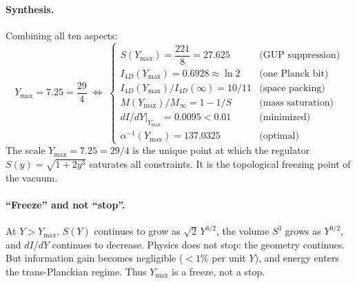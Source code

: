 \documentclass[a4paper,7pt,oneside,openany]{book}
\begin{document}
\paragraph{Synthesis.} Combining all ten aspects:
\begin{equation}
\boxed{
Y_{\max} = 7.25 = \frac{29}{4} \; \Longleftrightarrow \;
\begin{cases}
S(Y_{\max}) = \dfrac{221}{8} = 27.625 & \text{(GUP suppression)} \\
I_{4D}(Y_{\max}) = 0.6928 \approx \ln 2 & \text{(one Planck bit)} \\
I_{4D}(Y_{\max})/I_{4D}(\infty) = 10/11 & \text{(space packing)} \\
M(Y_{\max})/M_\infty = 1 - 1/S & \text{(mass saturation)} \\
dI/dY|_{Y_{\max}} = 0.0095 < 0.01 & \text{(minimized)} \\
\alpha^{-1}(Y_{\max}) = 137.0325 & \text{(optimal)}
\end{cases}
}
\label{eq:mviseqn}
\end{equation}
The scale \(Y_{\max} = 7.25 = 29/4\) is the unique point at which the regulator \(S(y) = \sqrt{1+2y^3}\) saturates all constraints. It is the topological freezing point of the vacuum.

\paragraph{``Freeze'' and not ``stop''.} At \(Y > Y_{\max}\), \(S(Y)\) continues to grow as \(\sqrt{2}\,Y^{3/2}\), the volume \(S^3\) grows as \(Y^{9/2}\), and \(dI/dY\) continues to decrease. Physics does not stop: the geometry continues. But information gain becomes negligible (\(<1\%\) per unit \(Y\)), and energy enters the trans-Planckian regime. Thus \(Y_{\max}\) is a freeze, not a stop.

\end{document}
